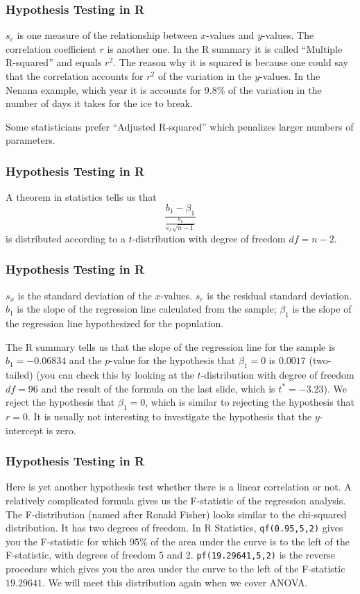 \documentclass[xcolor=dvipsnames]{beamer}
\begin{document}
\begin{frame}
  \frametitle{Hypothesis Testing in R}
  $s_{e}$ is one measure of the relationship between $x$-values and
  $y$-values. The correlation coefficient $r$ is another one. In the R
  summary it is called ``Multiple R-squared'' and equals $r^{2}$. The
  reason why it is squared is because one could say that the
  correlation accounts for $r^{2}$ of the variation in the $y$-values.
  In the Nenana example, which year it is accounts for 9.8\% of the
  variation in the number of days it takes for the ice to break.

  \bigskip

  Some statisticians prefer ``Adjusted R-squared'' which penalizes
  larger numbers of parameters.
\end{frame}

\begin{frame}
  \frametitle{Hypothesis Testing in R}
  A theorem in statistics tells us that
  \begin{equation}
    \label{eq:aekeeque}
    \frac{b_{1}-\beta_{1}}{\frac{s_{e}}{s_{x}\sqrt{n-1}}}
  \end{equation}
  is distributed according to a $t$-distribution with degree of
  freedom $df=n-2$. 
\end{frame}

\begin{frame}
  \frametitle{Hypothesis Testing in R}
  $s_{x}$ is the standard deviation of the $x$-values. $s_{e}$ is the
  residual standard deviation. $b_{1}$ is the slope of the regression
  line calculated from the sample; $\beta_{1}$ is the slope of the
  regression line hypothesized for the population.

  \bigskip
  
  The R summary tells us that the slope of the regression line for the
  sample is $b_{1}=-0.06834$ and the $p$-value for the hypothesis that
  $\beta_{1}=0$ is $0.0017$ (two-tailed) (you can check this by
  looking at the $t$-distribution with degree of freedom $df=96$ and
  the result of the formula on the last slide, which is
  $t^{\ast}=-3.23$). We reject the hypothesis that $\beta_{1}=0$,
  which is similar to rejecting the hypothesis that $r=0$. It is
  usually not interesting to investigate the hypothesis that the
  $y$-intercept is zero.
\end{frame}

\begin{frame}
  \frametitle{Hypothesis Testing in R}
  Here is yet another hypothesis test whether there is a linear
  correlation or not. A relatively complicated formula gives us the
  \alert{F-statistic} of the regression analysis. The F-distribution
  (named after Ronald Fisher) looks similar to the chi-squared
  distribution. It has two degrees of freedom. In R Statistics,
  \texttt{qf(0.95,5,2)} gives you the F-statistic for which 95\% of
  the area under the curve is to the left of the F-statistic, with
  degrees of freedom 5 and 2. \texttt{pf(19.29641,5,2)} is the reverse
  procedure which gives you the area under the curve to the left of
  the F-statistic $19.29641$. We will meet this distribution again
  when we cover ANOVA.
\end{frame}
\end{document}
